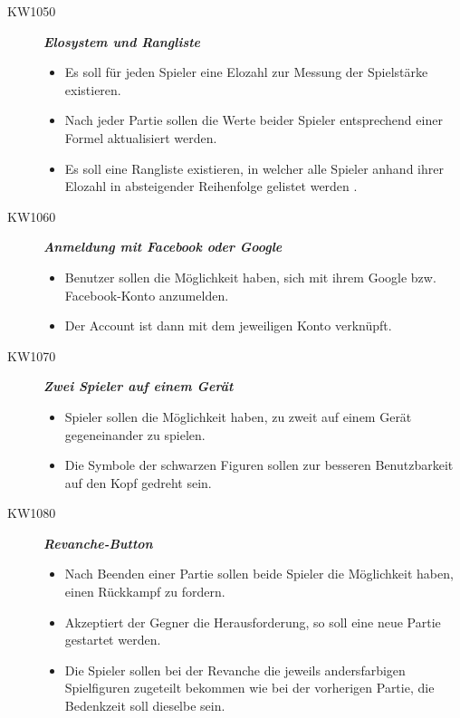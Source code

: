 \documentclass[parskip=full]{scrartcl}
\begin{document}
\begin{description}
	\item[KW1050] \textbf{\textit{\gls{Elo}system und Rangliste}}
	\begin{itemize}
	\item Es soll für jeden Spieler eine \gls{Elo}zahl zur Messung der Spielstärke existieren.
	\item Nach jeder Partie sollen die Werte beider Spieler entsprechend einer Formel aktualisiert werden.
	\item Es soll eine Rangliste existieren, in welcher alle Spieler anhand ihrer \gls{Elo}zahl in absteigender Reihenfolge gelistet werden .
	\end{itemize}
	
	\item[KW1060] \textbf{\textit{Anmeldung mit Facebook oder Google}}
	\begin{itemize}
	\item Benutzer sollen die Möglichkeit haben, sich mit ihrem Google bzw. Facebook-Konto anzumelden.
	\item Der Account ist dann mit dem jeweiligen Konto verknüpft.
	\end{itemize}
	
	\item[KW1070] \textbf{\textit{Zwei Spieler auf einem Gerät}}
	\begin{itemize}
	\item Spieler sollen die Möglichkeit haben, zu zweit auf einem Gerät gegeneinander zu spielen.
	\item Die Symbole der schwarzen Figuren sollen zur besseren Benutzbarkeit auf den Kopf gedreht sein.
	\end{itemize}
	
	\item[KW1080] \textbf{\textit{\gls{Revanche}-Button}}
	\begin{itemize}
	\item Nach Beenden einer Partie sollen beide Spieler die Möglichkeit haben, einen Rückkampf zu fordern.
	\item Akzeptiert der Gegner die Herausforderung, so soll eine neue Partie gestartet werden.
	\item Die Spieler sollen bei der Revanche die jeweils andersfarbigen Spielfiguren zugeteilt bekommen wie bei der vorherigen Partie, die \gls{Bedenkzeit} soll dieselbe sein.
	\end{itemize}
	
\end{description}
\end{document}
